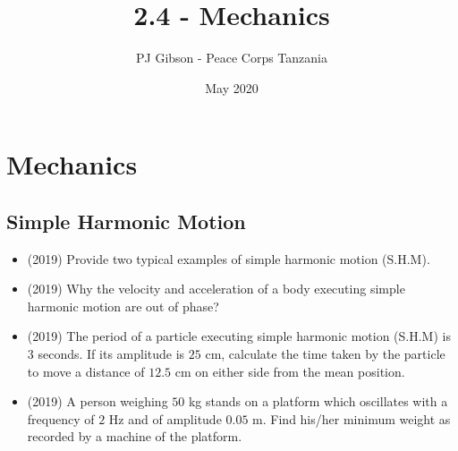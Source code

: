 \documentclass{article}
\title{2.4 - Mechanics}
\author{PJ Gibson - Peace Corps Tanzania}
\date{May 2020}
\begin{document}
\maketitle


\section{Mechanics}

\subsection{Simple Harmonic Motion}
\begin{itemize}
\item (2019)  Provide two typical examples of simple harmonic motion (S.H.M). 
\item (2019)  Why the velocity and acceleration of a body executing simple harmonic motion are out of phase? 
\item (2019)  The period of a particle executing simple harmonic motion (S.H.M) is $ 3$ seconds. If its amplitude is $ 25$ cm, calculate the time taken by the particle to move a distance of $ 12.5$ cm on either side from the mean position.
\item (2019)  A person weighing $ 50$ kg stands on a platform which oscillates with a frequency of $ 2$ Hz and of amplitude $ 0.05$ m. Find his/her minimum weight as recorded by a machine of the platform. 
\end{itemize}
\end{document}
